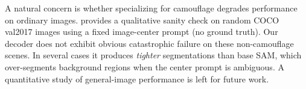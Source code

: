 A natural concern is whether specializing for camouflage degrades performance on ordinary images.  provides a qualitative sanity check on random COCO val2017 images using a fixed image-center prompt (no ground truth). Our decoder does not exhibit obvious catastrophic failure on these non-camouflage scenes. In several cases it produces \emph{tighter} segmentations than base SAM, which over-segments background regions when the center prompt is ambiguous. A quantitative study of general-image performance is left for future work.
